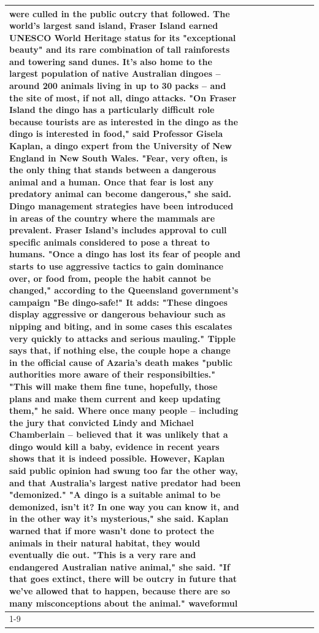 \begin{table}[H]
\begin{tabular}{lllrlllll}
were culled in the public outcry that followed. The world's largest sand island, Fraser Island earned UNESCO World Heritage status for its "exceptional beauty" and its rare combination of tall rainforests and towering sand dunes. It's also home to the largest population of native Australian dingoes -- around 200 animals living in up to 30 packs -- and the site of most, if not all, dingo attacks. "On Fraser Island the dingo has a particularly difficult role because tourists are as interested in the dingo as the dingo is interested in food," said Professor Gisela Kaplan, a dingo expert from the University of New England in New South Wales. "Fear, very often, is the only thing that stands between a dangerous animal and a human. Once that fear is lost any predatory animal can become dangerous," she said. Dingo management strategies have been introduced in areas of the country where the mammals are prevalent. Fraser Island's includes approval to cull specific animals considered to pose a threat to humans. "Once a dingo has lost its fear of people and starts to use aggressive tactics to gain dominance over, or food from, people the habit cannot be changed," according to the Queensland government's campaign "Be dingo-safe!" It adds: "These dingoes display aggressive or dangerous behaviour such as nipping and biting, and in some cases this escalates very quickly to attacks and serious mauling." Tipple says that, if nothing else, the couple hope a change in the official cause of Azaria's death makes "public authorities more aware of their responsibilties." "This will make them fine tune, hopefully, those plans and make them current and keep updating them," he said. Where once many people -- including the jury that convicted Lindy and Michael Chamberlain -- believed that it was unlikely that a dingo would kill a baby, evidence in recent years shows that it is indeed possible. However, Kaplan said public opinion had swung too far the other way, and that Australia's largest native predator had been "demonized." "A dingo is a suitable animal to be demonized, isn't it? In one way you can know it, and in the other way it's mysterious," she said. Kaplan warned that if more wasn't done to protect the animals in their natural habitat, they would eventually die out. "This is a very rare and endangered Australian native animal," she said. "If that goes extinct, there will be outcry in future that we've allowed that to happen, because there are so many misconceptions about the animal." waveformul \\
\cline{1-9}

\end{tabular}
\end{table}
